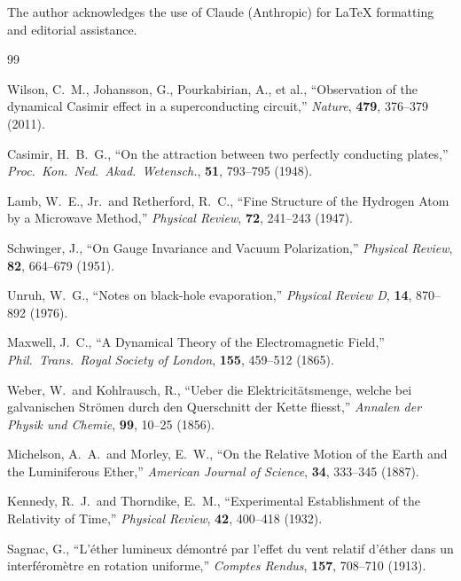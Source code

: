 \documentclass[12pt,letterpaper]{article}
\begin{document}
The author acknowledges the use of Claude (Anthropic) for \LaTeX{} formatting
and editorial assistance.

\bigskip


\begin{thebibliography}{99}

Wilson, C.~M., Johansson, G., Pourkabirian, A., et al.,
``Observation of the dynamical Casimir effect in a superconducting circuit,''
\textit{Nature}, \textbf{479}, 376--379 (2011).

Casimir, H.~B.~G.,
``On the attraction between two perfectly conducting plates,''
\textit{Proc.\ Kon.\ Ned.\ Akad.\ Wetensch.}, \textbf{51}, 793--795 (1948).

Lamb, W.~E., Jr.\ and Retherford, R.~C.,
``Fine Structure of the Hydrogen Atom by a Microwave Method,''
\textit{Physical Review}, \textbf{72}, 241--243 (1947).

Schwinger, J.,
``On Gauge Invariance and Vacuum Polarization,''
\textit{Physical Review}, \textbf{82}, 664--679 (1951).

Unruh, W.~G.,
``Notes on black-hole evaporation,''
\textit{Physical Review D}, \textbf{14}, 870--892 (1976).

Maxwell, J.~C.,
``A Dynamical Theory of the Electromagnetic Field,''
\textit{Phil.\ Trans.\ Royal Society of London}, \textbf{155}, 459--512 (1865).

Weber, W.\ and Kohlrausch, R.,
``Ueber die Elektricit\"{a}tsmenge, welche bei galvanischen Str\"{o}men durch den Querschnitt der Kette fliesst,''
\textit{Annalen der Physik und Chemie}, \textbf{99}, 10--25 (1856).

Michelson, A.~A.\ and Morley, E.~W.,
``On the Relative Motion of the Earth and the Luminiferous Ether,''
\textit{American Journal of Science}, \textbf{34}, 333--345 (1887).

Kennedy, R.~J.\ and Thorndike, E.~M.,
``Experimental Establishment of the Relativity of Time,''
\textit{Physical Review}, \textbf{42}, 400--418 (1932).

Sagnac, G.,
``L'\'{e}ther lumineux d\'{e}montr\'{e} par l'effet du vent relatif d'\'{e}ther dans un interf\'{e}rom\`{e}tre en rotation uniforme,''
\textit{Comptes Rendus}, \textbf{157}, 708--710 (1913).


\end{thebibliography}
\end{document}
